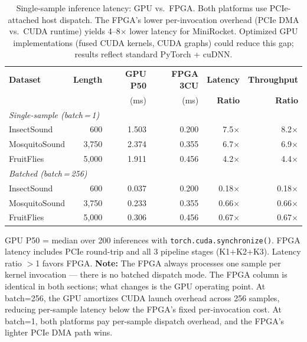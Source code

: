 \documentclass[11pt]{article}
\begin{document}
\begin{table}[H]
\centering
\caption{Single-sample inference latency: GPU vs.\ FPGA. Both platforms use
PCIe-attached host dispatch. The FPGA's lower per-invocation overhead (PCIe
DMA vs.\ CUDA runtime) yields 4--8$\times$ lower latency for MiniRocket.
Optimized GPU implementations (fused CUDA kernels, CUDA graphs) could
reduce this gap; results reflect standard PyTorch + cuDNN.}
\label{tab:batch1_latency}
\begin{tabular}{l r r r r r}
\toprule
\textbf{Dataset} & \textbf{Length} & \textbf{GPU P50} & \textbf{FPGA 3CU} & \textbf{Latency} & \textbf{Throughput} \\
 & & (ms) & (ms) & \textbf{Ratio} & \textbf{Ratio} \\
\midrule
\multicolumn{6}{l}{\textit{Single-sample (batch\,=\,1)}} \\
InsectSound   & 600   & 1.503 & 0.200 & 7.5$\times$ & 8.2$\times$ \\
MosquitoSound & 3{,}750 & 2.374 & 0.355 & 6.7$\times$ & 6.9$\times$ \\
FruitFlies    & 5{,}000 & 1.911 & 0.456 & 4.2$\times$ & 4.4$\times$ \\
\midrule
\multicolumn{6}{l}{\textit{Batched (batch\,=\,256)}} \\
InsectSound   & 600   & 0.037 & 0.200 & 0.18$\times$ & 0.18$\times$ \\
MosquitoSound & 3{,}750 & 0.233 & 0.355 & 0.66$\times$ & 0.66$\times$ \\
FruitFlies    & 5{,}000 & 0.306 & 0.456 & 0.67$\times$ & 0.67$\times$ \\
\bottomrule
\end{tabular}

\vspace{0.3em}

\begin{minipage}{\textwidth}
\footnotesize
GPU P50 = median over 200 inferences with \texttt{torch.cuda.synchronize()}.
FPGA latency includes PCIe round-trip and all 3 pipeline stages (K1+K2+K3).
Latency ratio $>$1 favors FPGA.
\textbf{Note:} The FPGA always processes one sample per kernel invocation ---
there is no batched dispatch mode. The FPGA column is identical in both
sections; what changes is the GPU operating point. At batch=256, the GPU
amortizes CUDA launch overhead across 256 samples, reducing per-sample
latency below the FPGA's fixed per-invocation cost. At batch=1, both
platforms pay per-sample dispatch overhead, and the FPGA's lighter
PCIe DMA path wins.
\end{minipage}
\end{table}
\end{document}

